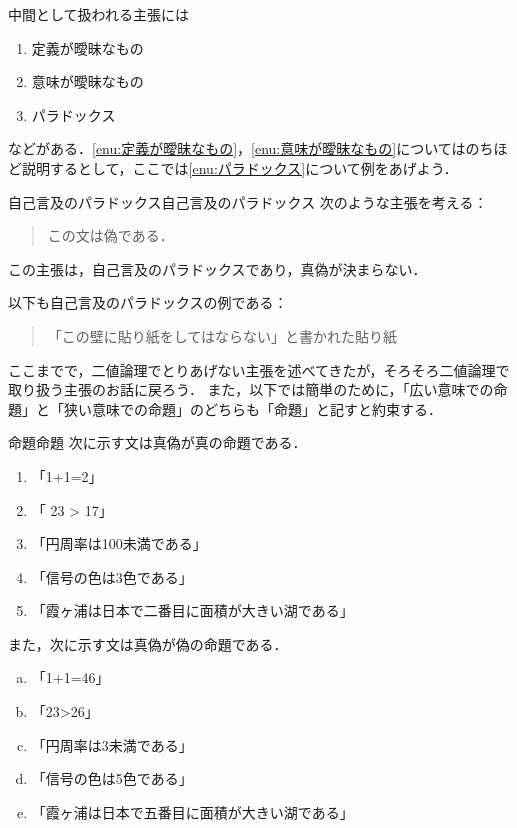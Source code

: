 \documentclass[a4paper,11pt]{ltjsarticle}
\begin{document}
中間として扱われる主張には
\begin{enumerate}[(1)]
	\item 定義が曖昧なもの \label{enu:定義が曖昧なもの}
	\item 意味が曖昧なもの \label{enu:意味が曖昧なもの}
	\item パラドックス \label{enu:パラドックス}
\end{enumerate}
などがある．\ref{enu:定義が曖昧なもの}，\ref{enu:意味が曖昧なもの}についてはのちほど説明するとして，ここでは\ref{enu:パラドックス}について例をあげよう．

\begin{example}{自己言及のパラドックス}{自己言及のパラドックス}
	次のような主張を考える：
	\begin{quote}
		この文は偽である．
	\end{quote}
	この主張は，自己言及のパラドックスであり，真偽が決まらない．
	
	以下も自己言及のパラドックスの例である：
	\begin{quote}
		「この壁に貼り紙をしてはならない」と書かれた貼り紙
	\end{quote}
\end{example}

ここまでで，二値論理でとりあげない主張を述べてきたが，そろそろ二値論理で取り扱う主張のお話に戻ろう．
また，以下では簡単のために，「広い意味での命題」と「狭い意味での命題」のどちらも「命題」と記すと約束する．


\begin{example}{命題}{命題}
    次に示す文は真偽が真の命題である．
    \begin{enumerate}[(1)]
        \item 「1+1=2」
        \item 「 23 > 17」
        \item 「円周率は100未満である」
        \item 「信号の色は3色である」
        \item 「霞ヶ浦は日本で二番目に面積が大きい湖である」
    \end{enumerate}
    また，次に示す文は真偽が偽の命題である．
    \begin{enumerate}[(a)]
        \item 「1+1=46」
        \item 「23>26」
        \item 「円周率は3未満である」
        \item 「信号の色は5色である」
        \item 「霞ヶ浦は日本で五番目に面積が大きい湖である」
    \end{enumerate}
\end{example}
\end{document}
